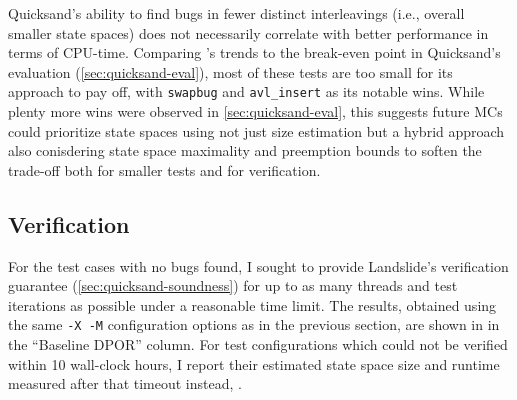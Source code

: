 Quicksand's ability to find bugs in fewer distinct interleavings (i.e., overall smaller state spaces)
does not necessarily correlate with better performance in terms of CPU-time.
Comparing 's trends
to the break-even point in Quicksand's evaluation (\cref{sec:quicksand-eval}),
most of these tests are too small for its approach to pay off,
with {\tt swapbug} and {\tt avl\_insert} as its notable wins.
While plenty more wins were observed in \cref{sec:quicksand-eval},
this suggests
future MCs could prioritize state spaces using not just size estimation
but a hybrid approach also conisdering state space maximality and preemption bounds \cite{chess-icb}
to soften the trade-off
both for smaller tests and for verification.

\subsection{Verification}
\label{sec:tm-verif}

For the test cases with no bugs found, I sought to provide Landslide's verification guarantee
(\cref{sec:quicksand-soundness})
for up to as many threads and test iterations as possible under a reasonable time limit.
The results, obtained using the same {\tt -X -M} configuration options as
in the previous section,
are shown in  in the ``Baseline DPOR'' column.
For test configurations which could not be verified
within 10 wall-clock hours,
I report their estimated state space size and runtime measured after that timeout instead,
.


